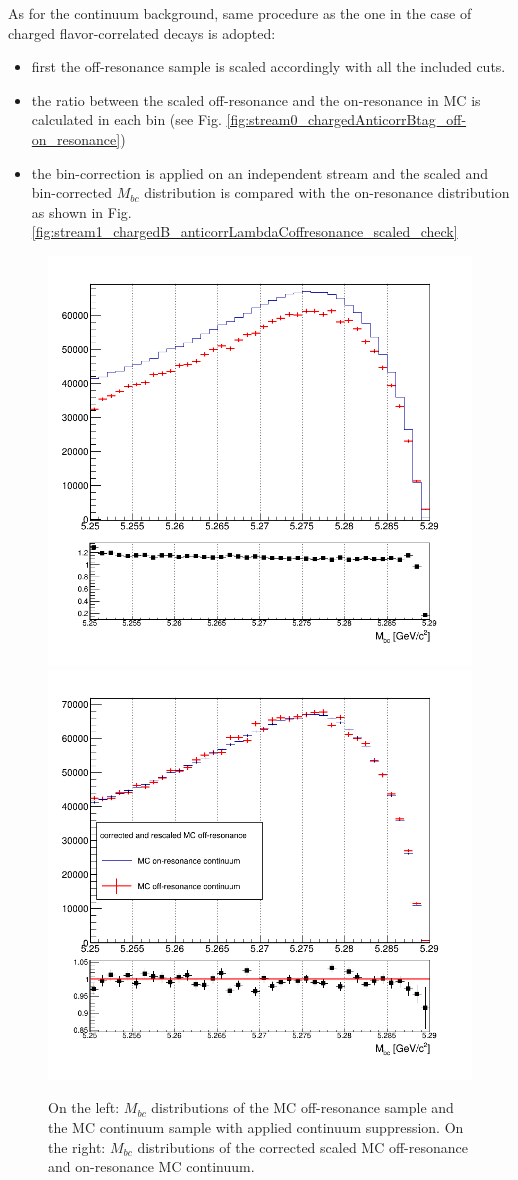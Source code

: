 \vspace{0.25 cm}

\noindent As for the continuum background, same procedure as the one in the case of charged flavor-correlated decays is adopted:

\begin{itemize}
    \item first the off-resonance sample is scaled accordingly with all the included cuts.
    \item the ratio between the scaled off-resonance and the on-resonance in MC is calculated in each bin (see Fig. \ref{fig:stream0_chargedAnticorrBtag_off-on_resonance})
    \item the bin-correction is applied on an independent stream and the scaled and bin-corrected $M_{bc}$ distribution is compared with the on-resonance distribution as shown in Fig. \ref{fig:stream1_chargedB_anticorrLambdaCoffresonance_scaled_check}
\end{itemize}

\begin{figure}[H]
 \centering
\subcaptionbox{\label{fig:stream0_chargedAnticorrBtag_off-on_resonance}}
{\includegraphics[width=.45\textwidth]{06-chargedAnticorrBtoLambda/figs/on_scaled_offRes_stream0_continuum.png}}
\subcaptionbox{\label{fig:stream1_chargedB_anticorrLambdaCoffresonance_scaled_check}}
{\includegraphics[width=.44\textwidth]{06-chargedAnticorrBtoLambda/figs/stream1_chargedB_anticorrLambdaCoffresonance_scaled_check.png}} 
\caption{On the left: $M_{bc}$ distributions of the MC off-resonance sample and the MC continuum sample with applied continuum suppression. On the right: $M_{bc}$ distributions of the corrected scaled MC off-resonance and on-resonance MC continuum.}
\end{figure}


